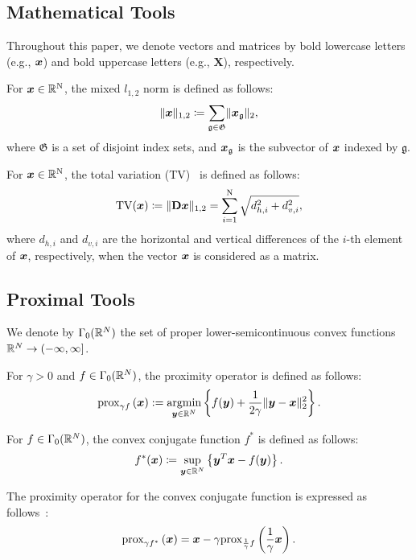 \subsection{Mathematical Tools} \label{subsec:mathematical-tools}

Throughout this paper, we denote vectors and matrices by bold lowercase letters (e.g., $\bm{x}$) and bold uppercase letters (e.g., $\bm{X}$), respectively.

For $\bm{x} \in \mathbb{R}^{\mathrm{N}}$, the mixed $l_{1,2}$ norm is defined as follows:
\begin{equation} \label{eq:L12NormDefinitionEq} \lVert \bm{x} \rVert _{1,2} \coloneq \sum_{\mathfrak{g} \in \mathfrak{G}} \lVert \bm{x}_\mathfrak{g} \rVert _2, \end{equation}
where $\mathfrak{G}$ is a set of disjoint index sets, and $\bm{x}_{\mathfrak{g}}$ is the subvector of $\bm{x}$ indexed by $\mathfrak{g}$.

For $\bm{x} \in \mathbb{R}^{\mathrm{N}}$, the total variation (TV)~\cite{TV} is defined as follows:
\begin{equation} \label{eq:TVDefinitionEq} \mathrm{TV}(\bm{x}) \coloneq \lVert \mathbf{D} \bm{x} \rVert _{1,2} = \sum_{i=1}^{\mathrm{N}} \sqrt{d_{h,i}^2 + d_{v,i}^2}, \end{equation}
where $d_{h,i}$ and $d_{v,i}$ are the horizontal and vertical differences of the $i$-th element of $\bm{x}$, respectively, when the vector $\bm{x}$ is considered as a matrix.



\subsection{Proximal Tools} \label{subsec:proximal-tools}

We denote by $\Gamma_0(\mathbb{R}^N)$ the set of proper lower-semicontinuous convex functions $\mathbb{R}^N \to (- \infty, \infty]$.

For $\gamma > 0$ and $f \in \Gamma_0(\mathbb{R}^N)$, the proximity operator is defined as follows:
\begin{equation} \label{eq:ProximityOperatorDefinitionEq} \mathrm{prox}_{ \gamma f }\left(\bm{x}\right) := \underset{\bm{y} \in \mathbb{R}^N}{\mathrm{argmin}} \left\{ f(\bm{y}) + \frac{1}{2 \gamma} \lVert \bm{y} - \bm{x} \rVert _2^2 \right\}. \end{equation}

For $f \in \Gamma_0(\mathbb{R}^N)$, the convex conjugate function $f^*$ is defined as follows:
\begin{equation} \label{eq:ConjugateFunctionDefinitionEq} f^*(\bm{x}) \coloneq \sup_{\bm{y} \in \mathbb{R}^N} \left\{ \bm{y}^T \bm{x} - f(\bm{y}) \right\}. \end{equation}

The proximity operator for the convex conjugate function is expressed as follows~\cite[Theorem 3.1 (ii)]{prox-convex-conjugate-function}:
\begin{equation} \label{eq:ProximityOperatorDefinitionWithConvexConjugateFunctionEq} \mathrm{prox}_{ \gamma f^* }\left(\bm{x}\right) = \bm{x} - \gamma \mathrm{prox}_{ \frac 1 \gamma f }\left(\frac 1 \gamma \bm{x}\right). \end{equation}

